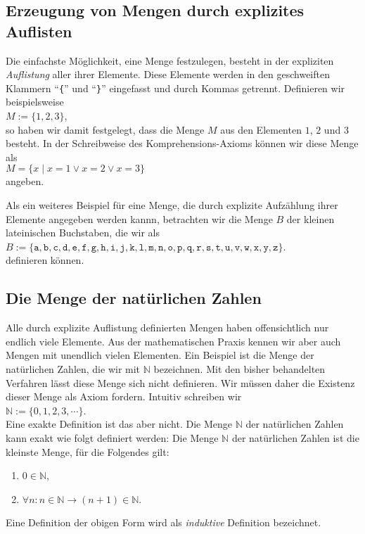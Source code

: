 \subsection{Erzeugung von Mengen durch explizites Auflisten}
Die einfachste Möglichkeit, eine Menge festzulegen, besteht in der expliziten
\emph{Auflistung} aller ihrer Elemente. Diese Elemente werden in den geschweiften
Klammern ``\texttt{\{}'' und ``\texttt{\}}'' eingefasst und durch Kommas getrennt.
Definieren wir beispielsweise \\[0.2cm]
\hspace*{1.3cm} $M := \{ 1, 2, 3 \}$, \\[0.2cm]
so haben wir damit festgelegt, dass die Menge $M$ aus den Elementen $1$, $2$ und $3$
besteht. In der Schreibweise des Komprehensions-Axioms können wir diese Menge als \\[0.2cm]
\hspace*{1.3cm} $M = \{ x \mid x = 1 \vee x = 2 \vee x = 3 \}$ \\[0.2cm]
angeben.

Als ein weiteres Beispiel für eine Menge, die durch explizite Aufzählung ihrer Elemente
angegeben werden kannn, betrachten wir die Menge $B$ der kleinen lateinischen Buchstaben, die wir als \\[0.2cm]
\hspace*{1.3cm} 
$B := \{\mathtt{a}, \mathtt{b}, \mathtt{c}, \mathtt{d}, \mathtt{e},
 \mathtt{f}, \mathtt{g}, \mathtt{h}, \mathtt{i}, \mathtt{j}, \mathtt{k}, \mathtt{l},
 \mathtt{m}, \mathtt{n}, \mathtt{o}, \mathtt{p}, \mathtt{q}, \mathtt{r}, \mathtt{s},
 \mathtt{t}, \mathtt{u}, \mathtt{v}, \mathtt{w}, \mathtt{x}, \mathtt{y}, \mathtt{z\}}$.
\\[0.2cm]
definieren können.

\subsection{Die Menge der natürlichen Zahlen}
Alle durch explizite Auflistung definierten Mengen haben offensichtlich nur endlich viele
Elemente.  Aus der mathematischen Praxis kennen wir aber auch Mengen mit unendlich vielen
Elementen.  Ein Beispiel ist die Menge der natürlichen Zahlen, die wir mit $\mathbb{N}$
bezeichnen.  Mit den bisher behandelten Verfahren lässt diese Menge sich nicht definieren.
Wir müssen daher die Existenz dieser Menge als Axiom fordern.  Intuitiv schreiben wir 
\\[0.2cm]
\hspace*{1.3cm} 
$\mathbb{N} := \{ 0, 1, 2, 3, \cdots \}$. 
\\[0.2cm]
Eine exakte Definition ist das aber nicht.  Die Menge $\mathbb{N}$ der
natürlichen Zahlen kann exakt wie folgt definiert werden:
Die Menge $\mathbb{N}$ der natürlichen Zahlen ist die kleinste Menge, für die Folgendes
gilt:
\begin{enumerate}
\item $0 \in \mathbb{N}$,
\item $\forall n: n \in \mathbb{N} \rightarrow (n + 1) \in \mathbb{N}$.
\end{enumerate}
Eine Definition der obigen Form wird als \emph{induktive} Definition bezeichnet.

